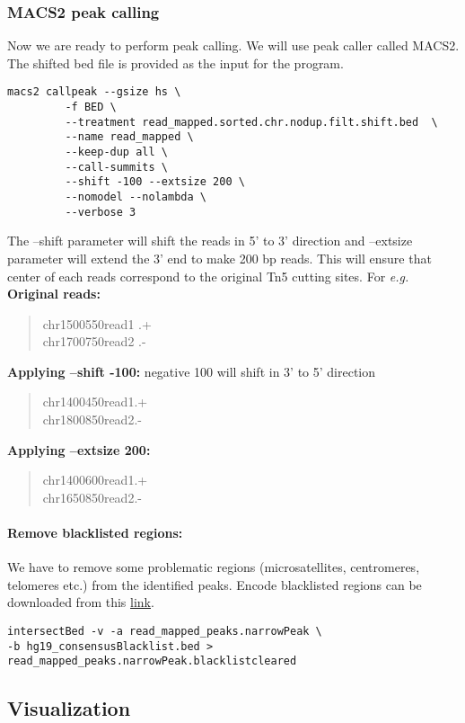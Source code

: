 \documentclass[10pt]{article}
\newcommand\tab[1][1cm]{\hspace*{#1}}
\begin{document}
\subsubsection{MACS2 peak calling} Now we are ready to perform peak calling. We will use  peak caller called MACS2. The shifted bed file is provided as the input for the program.
\begin{verbatim}
macs2 callpeak --gsize hs \
         -f BED \
         --treatment read_mapped.sorted.chr.nodup.filt.shift.bed  \
         --name read_mapped \
         --keep-dup all \
         --call-summits \
         --shift -100 --extsize 200 \
         --nomodel --nolambda \
         --verbose 3
\end{verbatim}
The --shift parameter  will shift the reads in 5' to 3' direction and --extsize parameter will extend the 3' end to make 200 bp reads. This will ensure that center of each reads correspond to the original Tn5 cutting sites. For {\em e.g.}\\
\textbf{Original reads:}
\begin{verse}
chr1\tab 500\tab 550\tab read1 \tab .\tab +\\
chr1\tab 700\tab 750\tab read2 \tab .\tab-
\end{verse}
\textbf{Applying --shift -100:} negative 100 will shift in 3' to 5' direction
\begin{verse}
chr1\tab 400\tab 450\tab read1\tab .\tab +\\
chr1\tab 800\tab 850\tab read2\tab .\tab -
\end{verse}
\textbf{Applying --extsize 200:}
\begin{verse}
chr1\tab 400\tab 600\tab read1\tab .\tab +\\
chr1\tab 650\tab 850\tab read2\tab .\tab -
\end{verse}
\paragraph{Remove blacklisted regions:} We have to remove some problematic regions (microsatellites, centromeres, telomeres etc.) from the identified peaks. Encode blacklisted regions can be downloaded from this \href{https://sites.google.com/site/anshulkundaje/projects/blacklists}{link}.
\begin{verbatim}
intersectBed -v -a read_mapped_peaks.narrowPeak \
-b hg19_consensusBlacklist.bed > read_mapped_peaks.narrowPeak.blacklistcleared
\end{verbatim}
\subsection{Visualization}
\end{document}

